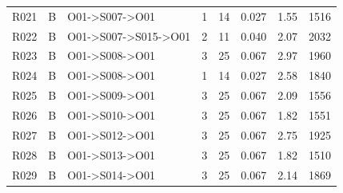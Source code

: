 \begin{center}
\begin{longtable}{lllccccc}
R021 & B & O01->S007->O01 & 1 & 14 & 0.027 & 1.55 & 1516 \\
R022 & B & O01->S007->S015->O01 & 2 & 11 & 0.040 & 2.07 & 2032 \\
R023 & B & O01->S008->O01 & 3 & 25 & 0.067 & 2.97 & 1960 \\
R024 & B & O01->S008->O01 & 1 & 14 & 0.027 & 2.58 & 1840 \\
R025 & B & O01->S009->O01 & 3 & 25 & 0.067 & 2.09 & 1556 \\
R026 & B & O01->S010->O01 & 3 & 25 & 0.067 & 1.82 & 1551 \\
R027 & B & O01->S012->O01 & 3 & 25 & 0.067 & 2.75 & 1925 \\
R028 & B & O01->S013->O01 & 3 & 25 & 0.067 & 1.82 & 1510 \\
R029 & B & O01->S014->O01 & 3 & 25 & 0.067 & 2.14 & 1869 \\
\hline\end{longtable}\end{center}
